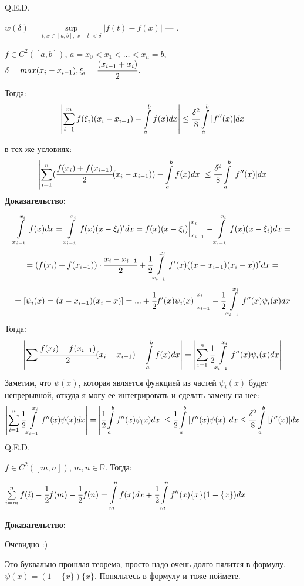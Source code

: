 \hfill Q.E.D.

$w(\delta) = \sup\limits_{t,x \in [a,b], |x-t|<\delta} |f(t) - f(x)|$ --- .



$f \in C^2([a,b])$, $a = x_0<x_1<\ldots< x_n =b$, $\delta = max(x_i-x_{i-1}), \xi_i = \cfrac{(x_{i-1}+x_i)}{2}$.

Тогда:
$$\left|\sum\limits_{i=1}^m f(\xi_i)(x_i-x_{i-1}) - \displaystyle\int\limits_{a}^{b}f(x) dx\right|\leq \cfrac{\delta^2}{8}\displaystyle\int\limits_{a}^{b} |f''(x)|dx$$

в тех же условиях:
$$\left|\sum\limits_{i=1}^n (\cfrac{f(x_i)+f(x_{i-1})}{2}(x_i-x_{i-1}))-\displaystyle\int\limits_{a}^{b}f(x) dx\right|\leq \cfrac{\delta^2}{8}\displaystyle\int\limits_{a}^{b} |f''(x)|dx$$
\textbf{Доказательство:}

$$\displaystyle\int\limits_{x_{i-1}}^{x_i}f(x)dx =\displaystyle\int\limits_{x_{i-1}}^{x_i}f(x)(x-\xi_i)'dx=f(x)(x-\xi_i)\Big|_{x_{i-1}}^{x_i} - \displaystyle\int\limits_{x_{i-1}}^{x_i}f(x) (x-\xi_i)dx =$$
$$= (f(x_i)+f(x_{i-1}))\cdot \cfrac{x_i-x_{i-1}}{2} + \cfrac{1}{2}\displaystyle\int\limits_{x_{i-1}}^{x_i}f'(x)((x-x_{i-1})(x_i-x))'dx = $$
$$=[\psi_i(x) = (x-x_{i-1})(x_i-x)]= ... +\cfrac{1}{2} f'(x)\psi_i(x) \Big|_{x_{i-1}}^{x_i} - \cfrac{1}{2}\displaystyle\int\limits_{x_{i-1}}^{x_i}f''(x) \psi_i(x)dx $$
Тогда:
$$\left |\sum \cfrac{f(x_i)-f(x_{i-1})}{2}(x_i-x_{i-1})-\displaystyle\int\limits_{a}^{b}f(x)dx \right| = \left| \sum\limits_{i=1}^n\cfrac{1}{2}\displaystyle\int\limits_{x_{i-1}}^{x_i}f''(x)\psi_i(x) dx\right|$$
Заметим, что $\psi(x)$, которая является функцией из частей $\psi_i(x)$ будет непрерывной, откуда я могу ее интегрировать и сделать замену на нее:
$$\left| \sum\limits_{i=1}^n\cfrac{1}{2}\displaystyle\int\limits_{x_{i-1}}^{x_i}f''(x)\psi(x) dx\right| = \left| \cfrac{1}{2}\displaystyle\int\limits_{a}^{b}f''(x)\psi_(x) dx\right|\leq \cfrac{1}{2}\displaystyle\int\limits_{a}^{b}\left|f''(x)\psi(x)\right|dx \leq \cfrac{\delta^2}{8}\displaystyle\int\limits_{a}^{b} |f''(x)|dx$$
\hfill Q.E.D.


$f \in C^2([m,n])$, $m,n \in \mathbb{R}$. Тогда:

$\sum\limits_{i=m}^n f(i) - \cfrac{1}{2}f(m) - \cfrac{1}{2}f(n)= \displaystyle\int\limits_{m}^{n}{f(x)}{dx}+ \cfrac{1}{2}\displaystyle\int\limits_{m}^{n}f''(x)\{x\}(1-\{x\})dx$

\textbf{Доказательство:}

Очевидно :)

Это буквально прошлая теорема, просто надо очень долго пялится в формулу.  $\psi(x) = (1-\{x\})\{x\}$. Попяльтесь в формулу и тоже поймете.

